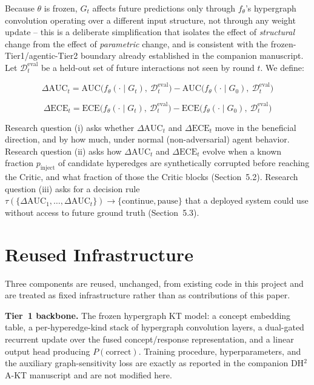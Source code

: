 \documentclass[review,12pt]{elsarticle}
\begin{document}
Because $\theta$ is frozen, $G_t$ affects future predictions only through
$f_\theta$'s hypergraph convolution operating over a different input
structure, not through any weight update -- this is a deliberate
simplification that isolates the effect of \emph{structural} change from
the effect of \emph{parametric} change, and is consistent with the
frozen-Tier1/agentic-Tier2 boundary already established in the companion
manuscript. Let $\mathcal{D}_t^{\text{eval}}$ be a held-out set of future
interactions not seen by round $t$. We define:

\[
\Delta\text{AUC}_t = \text{AUC}\big(f_\theta(\cdot \mid G_t),\ \mathcal{D}_t^{\text{eval}}\big) - \text{AUC}\big(f_\theta(\cdot \mid G_0),\ \mathcal{D}_t^{\text{eval}}\big)
\]

\[
\Delta\text{ECE}_t = \text{ECE}\big(f_\theta(\cdot \mid G_t),\ \mathcal{D}_t^{\text{eval}}\big) - \text{ECE}\big(f_\theta(\cdot \mid G_0),\ \mathcal{D}_t^{\text{eval}}\big)
\]

Research question (i) asks whether $\Delta\text{AUC}_t$ and
$\Delta\text{ECE}_t$ move in the beneficial direction, and by how much,
under normal (non-adversarial) agent behavior. Research question (ii)
asks how $\Delta\text{AUC}_t$ and $\Delta\text{ECE}_t$ evolve when a
known fraction $p_{\text{inject}}$ of candidate hyperedges are
synthetically corrupted before reaching the Critic, and what fraction of
those the Critic blocks (Section~5.2). Research question (iii) asks for
a decision rule $\tau(\{\Delta\text{AUC}_1, \dots, \Delta\text{AUC}_t\})
\to \{\text{continue}, \text{pause}\}$ that a deployed system could use
without access to future ground truth (Section~5.3).

\section{Reused Infrastructure}

Three components are reused, unchanged, from existing code in this
project and are treated as fixed infrastructure rather than as
contributions of this paper.

\textbf{Tier~1 backbone.} The frozen hypergraph KT model: a concept
embedding table, a per-hyperedge-kind stack of hypergraph convolution
layers, a dual-gated recurrent update over the fused concept/response
representation, and a linear output head producing $P(\text{correct})$.
Training procedure, hyperparameters, and the auxiliary graph-sensitivity
loss are exactly as reported in the companion DH$^2$A-KT manuscript and
are not modified here.
\end{document}
